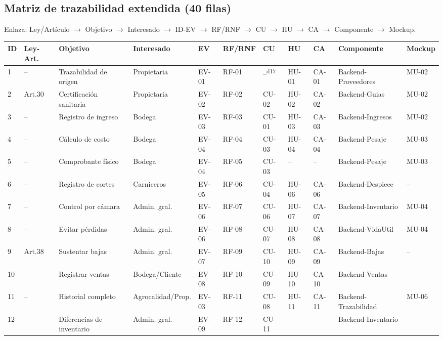 \documentclass[11pt,a4paper]{article}
\begin{document}
\subsection{Matriz de trazabilidad extendida (40 filas)}
Enlaza: Ley/Artículo $\to$ Objetivo $\to$ Interesado $\to$ ID-EV $\to$ RF/RNF $\to$ CU $\to$ HU $\to$ CA $\to$ Componente $\to$ Mockup.

\scriptsize
\begin{longtable}{|p{0.5cm}|p{1.5cm}|p{2.2cm}|p{1.5cm}|p{0.8cm}|p{0.8cm}|p{0.8cm}|p{0.8cm}|p{0.8cm}|p{1.3cm}|p{1cm}|}
\hline
\textbf{ID} & \textbf{Ley-Art.} & \textbf{Objetivo} & \textbf{Interesado} & \textbf{EV} & \textbf{RF/RNF} & \textbf{CU} & \textbf{HU} & \textbf{CA} & \textbf{Componente} & \textbf{Mockup} \\
\hline
1 & -- & Trazabilidad de origen & Propietaria & EV-01 & RF-01 & --\textsuperscript{d17} & HU-01 & CA-01 & Backend-Proveedores & MU-02 \\
2 & Art.30 & Certificación sanitaria & Propietaria & EV-02 & RF-02 & CU-02 & HU-02 & CA-02 & Backend-Guias & MU-02 \\
3 & -- & Registro de ingreso & Bodega & EV-03 & RF-03 & CU-01 & HU-03 & CA-03 & Backend-Ingresos & MU-02 \\
4 & -- & Cálculo de costo & Bodega & EV-04 & RF-04 & CU-03 & HU-04 & CA-04 & Backend-Pesaje & MU-03 \\
5 & -- & Comprobante físico & Bodega & EV-04 & RF-05 & CU-03 & -- & -- & Backend-Pesaje & MU-03 \\
6 & -- & Registro de cortes & Carniceros & EV-05 & RF-06 & CU-04 & HU-06 & CA-06 & Backend-Despiece & -- \\
7 & -- & Control por cámara & Admin. gral. & EV-06 & RF-07 & CU-06 & HU-07 & CA-07 & Backend-Inventario & MU-04 \\
8 & -- & Evitar pérdidas & Admin. gral. & EV-06 & RF-08 & CU-07 & HU-08 & CA-08 & Backend-VidaUtil & MU-04 \\
9 & Art.38 & Sustentar bajas & Admin. gral. & EV-07 & RF-09 & CU-10 & HU-09 & CA-09 & Backend-Bajas & -- \\
10 & -- & Registrar ventas & Bodega/Cliente & EV-08 & RF-10 & CU-09 & HU-10 & CA-10 & Backend-Ventas & -- \\
11 & -- & Historial completo & Agrocalidad/Prop. & EV-03 & RF-11 & CU-08 & HU-11 & CA-11 & Backend-Trazabilidad & MU-06 \\
12 & -- & Diferencias de inventario & Admin. gral. & EV-09 & RF-12 & CU-11 & -- & -- & Backend-Inventario & -- \\

\end{longtable}
\end{document}
